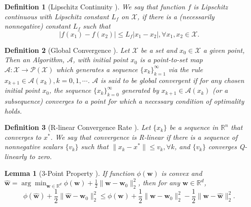 \documentclass{article}
\newtheorem{lemma}{Lemma}
\newtheorem{defi}{Definition}
\newtheorem{thm}{Theorem}
\begin{document}
	
\begin{defi}[Lipschitz Continuity \cite{erikssonapplied}]\label{defi:Lipschitz}
We say that function $f$ is {\em Lipschitz continuous} with Lipschitz constant $L_f$ on $\mathcal{X}$, if there is a (necessarily nonnegative) constant $L_f$ such that
$$|f(x_1)-f(x_2)|\leq L_f|x_1-x_2|, \forall x_1 , x_2 \in \mathcal{X}.$$
\end{defi}

\begin{defi}[Global Convergence \cite{lanckriet2009convergence}]\label{def:gl_conv}
Let $\mathcal{X}$ be a set and $x_0\in\mathcal{X}$ a given point, Then an Algorithm, $\mathcal{A}$, with initial point $x_0$ is a point-to-set map $\mathcal{A}: \mathcal{X}\rightarrow\mathcal{P}(\mathcal{X})$ which generates a sequence $\{x_k\}_{k=1}^{\infty}$ via the rule $x_{k+1}\in \mathcal{A}(x_k), k=0,1,\cdots$. $\mathcal{A}$ is said to be {\em global convergent} if for any chosen initial point $x_0$, the sequence $\{x_k\}_{k=0}^{\infty}$ generated by $x_{k+1}\in \mathcal{A}(x_k)$ (or a subsequence) converges to a point for which a necessary condition of optimality holds.
\end{defi}
    
\begin{defi}[R-linear Convergence Rate \cite{nocedal99}]\label{defi:rate}
Let $\{x_k\}$ be a sequence in $\mathbb{R}^n$ that converges to $x^*$. We say that convergence is {\em R-linear} if there is a sequence of nonnegative scalars $\{v_k\}$ such that $\|x_k-x^*\|\leq v_k, \forall k$, and $\{v_k\}$ converges Q-linearly to zero.
\end{defi}    

\begin{lemma}[3-Point Property \cite{Baldassarre}]\label{lem:3-point}
If function $\phi(\mathbf{w})$ is convex and $\hat{\mathbf{w}}=\arg\min_{\mathbf{w}\in\mathbb{R}^d}\phi(\mathbf{w})+\frac{1}{2}\|\mathbf{w}-\mathbf{w}_0\|_2^2$, then for any $\mathbf{w}\in\mathbb{R}^d$,
$$
\phi(\hat{\mathbf{w}})+\frac{1}{2}\|\hat{\mathbf{w}}-\mathbf{w}_0\|_2^2\leq\phi(\mathbf{w})+\frac{1}{2}\|\mathbf{w}-\mathbf{w}_0\|_2^2-\frac{1}{2}\|\mathbf{w}-\hat{\mathbf{w}}\|_2^2.
$$
\end{lemma}
\end{document}
